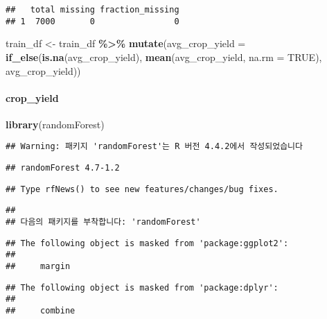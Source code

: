 \documentclass[
]{article}
\newenvironment{Shaded}{\begin{snugshade}}{\end{snugshade}}
\newcommand{\AttributeTok}[1]{\textcolor[rgb]{0.13,0.29,0.53}{#1}}
\newcommand{\ConstantTok}[1]{\textcolor[rgb]{0.56,0.35,0.01}{#1}}
\newcommand{\FunctionTok}[1]{\textcolor[rgb]{0.13,0.29,0.53}{\textbf{#1}}}
\newcommand{\NormalTok}[1]{#1}
\newcommand{\OtherTok}[1]{\textcolor[rgb]{0.56,0.35,0.01}{#1}}
\newcommand{\SpecialCharTok}[1]{\textcolor[rgb]{0.81,0.36,0.00}{\textbf{#1}}}
\begin{document}
\begin{verbatim}
##   total missing fraction_missing
## 1  7000       0                0
\end{verbatim}

\begin{Shaded}
\begin{Highlighting}[]
\NormalTok{train\_df }\OtherTok{\textless{}{-}}\NormalTok{ train\_df }\SpecialCharTok{\%\textgreater{}\%}
  \FunctionTok{mutate}\NormalTok{(}\AttributeTok{avg\_crop\_yield =} \FunctionTok{if\_else}\NormalTok{(}\FunctionTok{is.na}\NormalTok{(avg\_crop\_yield), }
                                  \FunctionTok{mean}\NormalTok{(avg\_crop\_yield, }\AttributeTok{na.rm =} \ConstantTok{TRUE}\NormalTok{), }
\NormalTok{                                  avg\_crop\_yield))}
\end{Highlighting}
\end{Shaded}

\hypertarget{crop_yield}{%
\paragraph{crop\_yield}\label{crop_yield}}

\begin{Shaded}
\begin{Highlighting}[]
\FunctionTok{library}\NormalTok{(randomForest)}
\end{Highlighting}
\end{Shaded}

\begin{verbatim}
## Warning: 패키지 'randomForest'는 R 버전 4.4.2에서 작성되었습니다
\end{verbatim}

\begin{verbatim}
## randomForest 4.7-1.2
\end{verbatim}

\begin{verbatim}
## Type rfNews() to see new features/changes/bug fixes.
\end{verbatim}

\begin{verbatim}
## 
## 다음의 패키지를 부착합니다: 'randomForest'
\end{verbatim}

\begin{verbatim}
## The following object is masked from 'package:ggplot2':
## 
##     margin
\end{verbatim}

\begin{verbatim}
## The following object is masked from 'package:dplyr':
## 
##     combine
\end{verbatim}
\end{document}

